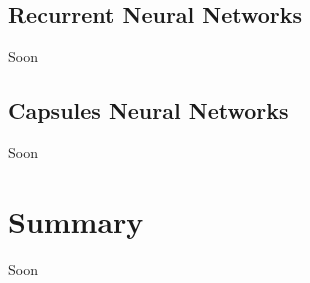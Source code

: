 \vspace{-0.3cm}


\subsection{Recurrent Neural Networks}\label{sec:3.8.3}
\vspace{-0.5cm}
\noindent Soon


\vspace{-0.3cm}

\subsection{Capsules Neural Networks}\label{sec:3.8.4}
\vspace{-0.5cm}
\noindent Soon


\vspace{-0.3cm}




\section{Summary}\label{sec:3.9}
\vspace{-0.5cm}
\noindent Soon

\vspace{-0.3cm}



